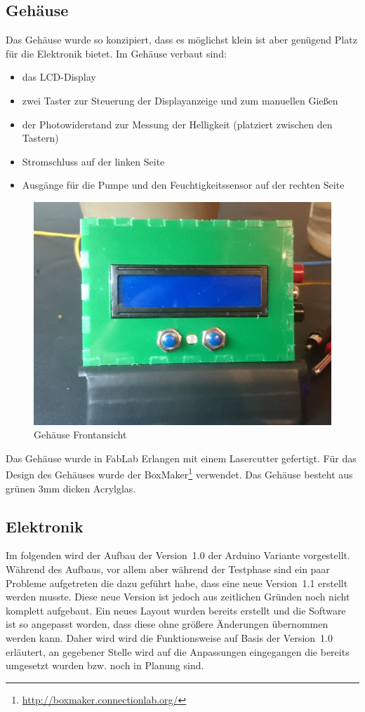 \documentclass[]{IEEEtran}
\begin{document}
	
	
\subsection{Gehäuse}
	Das Gehäuse wurde so konzipiert, dass es möglichst klein ist aber genügend Platz für die Elektronik bietet.
	Im Gehäuse verbaut sind:
\begin{itemize}
	\item das LCD-Display
	\item zwei Taster zur Steuerung der Displayanzeige und zum manuellen Gießen
	\item der Photowiderstand zur Messung der Helligkeit (platziert zwischen den Tastern)
	\item Stromschluss auf der linken Seite
	\item Ausgänge für die Pumpe und den Feuchtigkeitssensor auf der rechten Seite

\end{itemize}	

	\begin{figure}[!h]
	\includegraphics[width=0.8\linewidth]{bilder/_boxFron1.jpg}	
	\caption{Gehäuse Frontansicht}
	\label{fig-Gehäuse}
	\end{figure}
	
Das Gehäuse wurde in FabLab Erlangen mit einem Lasercutter gefertigt. 
Für das Design des Gehäuses wurde der BoxMaker\footnote{ \href{http://boxmaker.connectionlab.org/}{http://boxmaker.connectionlab.org/}} verwendet. 
Das Gehäuse besteht aus grünen 3mm dicken Acrylglas.
	
\subsection{Elektronik}
	Im folgenden wird der Aufbau der Version~1.0 der Arduino Variante vorgestellt. 
	Während des Aufbaus, vor allem aber während der Testphase sind ein paar Probleme aufgetreten die dazu geführt habe, dass eine neue Version~1.1 erstellt werden musste. 
	Diese neue Version ist jedoch aus zeitlichen Gründen noch nicht komplett aufgebaut. 
	Ein neues Layout wurden bereits erstellt und die Software ist so angepasst worden, dass diese ohne größere Änderungen übernommen werden kann. 
	Daher wird wird die Funktionsweise auf Basis der Version~1.0 erläutert, an gegebener Stelle wird auf die Anpassungen eingegangen die bereits umgesetzt wurden bzw. noch in Planung sind. 
\end{document}
